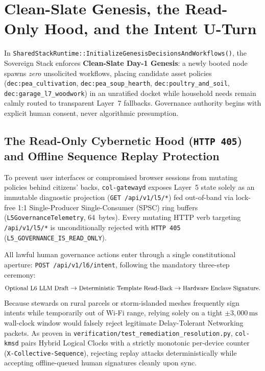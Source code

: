 \section{Clean-Slate Genesis, the Read-Only Hood, and the Intent U-Turn}
\label{sec:ch1-intent-uturn}

In \texttt{SharedStackRuntime::InitializeGenesisDecisionsAndWorkflows()}, the Sovereign Stack
enforces \textbf{Clean-Slate Day-1 Genesis}: a newly booted node spawns \textit{zero}
unsolicited workflows, placing candidate asset policies (\texttt{dec:pea\_cultivation},
\texttt{dec:pea\_soup\_hearth}, \texttt{dec:poultry\_and\_soil}, \texttt{dec:garage\_l7\_woodwork})
in an unratified docket while household needs remain calmly routed to transparent Layer~7
fallbacks. Governance authority begins with explicit human consent, never algorithmic presumption.

\subsection{The Read-Only Cybernetic Hood (\texttt{HTTP 405}) and Offline Sequence Replay Protection}

To prevent user interfaces or compromised browser sessions from mutating policies behind
citizens' backs, \texttt{col-gatewayd} exposes Layer~5 state solely as an immutable diagnostic
projection (\texttt{GET /api/v1/l5/*}) fed out-of-band via lock-free 1:1 Single-Producer
Single-Consumer (SPSC) ring buffers (\texttt{L5GovernanceTelemetry}, 64~bytes). Every mutating
HTTP verb targeting \texttt{/api/v1/l5/*} is unconditionally rejected with \texttt{HTTP 405}
(\texttt{L5\_GOVERNANCE\_IS\_READ\_ONLY}).

All lawful human governance actions enter through a single constitutional aperture:
\texttt{POST /api/v1/l6/intent}, following the mandatory three-step ceremony:
\[
{\small \text{Optional L6 LLM Draft} \rightarrow
\text{Deterministic Template Read-Back} \rightarrow
\text{Hardware Enclave Signature}.}
\]
Because stewards on rural parcels or storm-islanded meshes frequently sign intents while
temporarily out of Wi-Fi range, relying solely on a tight $\pm 3{,}000\,\mathrm{ms}$ wall-clock
window would falsely reject legitimate Delay-Tolerant Networking packets. As proven in
\texttt{verification/test\_remediation\_resolution.py}, \texttt{col-kmsd} pairs Hybrid Logical
Clocks \parencite{kulkarni2014logical} with a strictly monotonic per-device counter
(\texttt{X-Collective-Sequence}), rejecting replay attacks deterministically while accepting
offline-queued human signatures cleanly upon sync.

